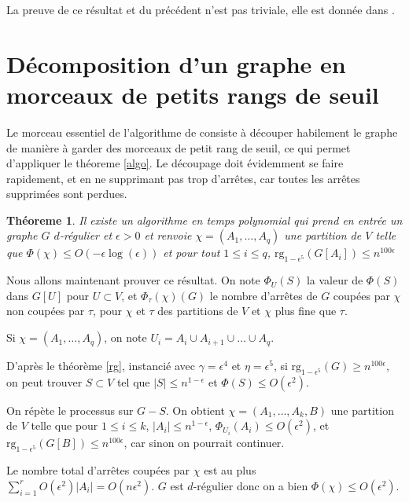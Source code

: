 \documentclass[a4paper,10pt]{article}
\theoremstyle{plain}
\newtheorem{theo}{Théoreme}
\theoremstyle{Definition}
\theoremstyle{remark}
\newcommand{\rg}{\mathrm{rg}}
\begin{document}
La preuve de ce résultat et du précédent n'est pas triviale, elle est
donnée dans \cite{St10}.

\section{Décomposition d'un graphe en morceaux de petits rangs de seuil}

Le morceau essentiel de l'algorithme de \cite{St10} consiste à découper
habilement le graphe de manière à garder des morceaux de petit rang de
seuil, ce qui permet d'appliquer le théoreme \ref{algo}. Le découpage doit
évidemment se faire rapidement, et en ne supprimant pas trop d'arrêtes, car
toutes les arrêtes supprimées sont perdues.

\begin{theo}
Il existe un algorithme en temps polynomial qui prend en entrée un graphe
$G$ $d$-régulier et $\epsilon > 0$ et renvoie $\chi = (A_1,\dots,A_q)$ une
partition de $V$ telle que $\Phi(\chi) \leq O(- \epsilon \log (\epsilon))$
et pour tout $1 \leq i \leq q$, $\rg_{1-\epsilon^5}(G[A_i]) \leq n^{100 \epsilon}$
\label{algo2}
\end{theo}

Nous allons maintenant prouver ce résultat. On note $\Phi_U(S)$ la valeur
de $\Phi(S)$ dans $G[U]$ pour $U \subset V$, et $\Phi_{\tau}(\chi)(G)$ le
nombre d'arrêtes de $G$ coupées par $\chi$ non coupées par $\tau$, pour $\chi$
et $\tau$ des partitions de $V$ et $\chi$ plus fine que $\tau$.

Si $\chi = (A_1,\dots,A_q)$, on note $U_i = A_i \cup A_{i+1} \cup \dots
\cup A_q$.

\vspace{1cm}

D'après le théorème \ref{rg}, instancié avec $\gamma = \epsilon^4$ et $\eta
= \epsilon^5$, si $\rg_{1-\epsilon^5}(G) \geq n^{100 \epsilon}$, on peut
trouver $S \subset V$ tel que $|S| \leq n^{1-\epsilon}$ et $\Phi(S) \leq
O(\epsilon^2)$.

\vspace{0.5cm}

On répète le processus sur $G - S$. On obtient $\chi = (A_1,\dots,A_k,B)$ une
partition de $V$ telle que pour $1\leq i \leq k$, $|A_i| \leq n^{1 -
  \epsilon}$, $\Phi_{U_i}(A_i) \leq O(\epsilon^2)$, et $\rg_{1- \epsilon^5}(G[B])
\leq n^{100 \epsilon}$, car sinon on pourrait continuer.

Le nombre total d'arrêtes coupées par $\chi$ est au plus $\sum_{i=1}^r
O(\epsilon^2)|A_i| = O(n \epsilon^2)$. $G$ est $d$-régulier donc on a bien
$\Phi(\chi) \leq O(\epsilon ^2)$.
\end{document}
